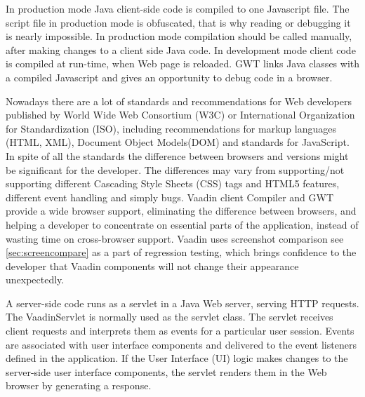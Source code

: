    In production mode Java  client-side code is compiled to one Javascript file. The script file in
   production mode is obfuscated, that is why reading or debugging it is nearly
   impossible. In production mode compilation should be called manually,
   after making changes to a client side Java code.
   In development mode client code is compiled at run-time, when Web page
   is reloaded. GWT links Java classes  with a compiled Javascript and gives
   an opportunity to debug code in a browser.
  
   Nowadays there are a lot of standards and recommendations for Web
   developers published by World Wide Web Consortium (W3C) or  International
   Organization for Standardization (ISO), including recommendations for
   markup languages (HTML, XML), Document Object Models(DOM) and standards
   for JavaScript. In spite of all the standards the difference between browsers
   and versions might be significant for the developer. The differences may vary
   from supporting/not supporting different Cascading Style Sheets (CSS) tags
   and HTML5 features, different event handling and simply bugs. Vaadin client Compiler and GWT provide a wide browser
   support, eliminating the difference between browsers, and helping a
   developer to concentrate on essential parts of the application, instead of
   wasting time on cross-browser support. Vaadin uses screenshot comparison see
   \ref{sec:screencompare} as a part of regression testing, which brings
   confidence to the developer that Vaadin components will not change their
   appearance unexpectedly. 
   
   A server-side code runs as a servlet in a Java Web server, serving HTTP
   requests.
   The VaadinServlet is normally used as the servlet class. The servlet receives client requests
   and interprets them as events for a particular user session.
   Events are associated with user interface components and delivered to the event listeners defined in the application.
   If the User Interface (UI) logic makes changes to the server-side user
   interface components, the servlet renders them in the Web browser by generating a response.
   
